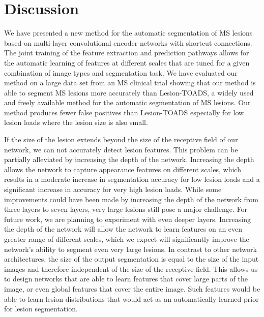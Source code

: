 \section{Discussion}


We have presented a new method for the automatic segmentation of MS lesions
based on multi-layer convolutional encoder networks with shortcut connections.
The joint training of the feature extraction and prediction pathways allows for
the automatic learning of features at different scales that are tuned for a
given combination of image types and segmentation task. We have evaluated our
method on a large data set from an MS clinical trial showing that our method is
able to segment MS lesions more accurately than Lesion-TOADS, a widely used and
freely available method for the automatic segmentation of MS lesions. Our method
produces fewer false positives than Lesion-TOADS especially for low lesion loads
where the lesion size is also small.


If the size of the lesion extends beyond the size of the receptive field of our
network, we can not accurately detect lesion features. This problem can be
partially alleviated by increasing the depth of the network. Increasing the
depth allows the network to capture appearance features on different scales,
which results in a moderate increase in segmentation accuracy for low lesion
loads and a significant increase in accuracy for very high lesion loads. While
some improvements could have been made by increasing the depth of the network
from three layers to seven layers, very large lesions still pose a major
challenge. For future work, we are planning to experiment with even deeper
layers. Increasing the depth of the network will allow the network to learn
features on an even greater range of different scales, which we expect will
significantly improve the network's ability to segment even very large lesions.
In contrast to other network architectures, the size of the output segmentation
is equal to the size of the input images and therefore independent of the size
of the receptive field. This allows us to design networks that are able to learn
features that cover large parts of the image, or even global features that cover
the entire image. Such features would be able to learn lesion distributions that
would act as an automatically learned prior for lesion segmentation.

